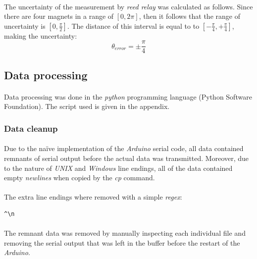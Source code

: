 \documentclass[a4paper]{article}
\begin{document}
\paragraph*{}
The uncertainty of the measurement by \textit{reed relay} was calculated as
follows. Since there are four magnets in a range of $\left[ 0, 2 \pi \right]$,
then it follows that the range of uncertainty is $\left[ 0, \frac{\pi}{2}
\right]$. The distance of this interval is equal to to $\left[ - \frac{\pi}{4}
, + \frac{\pi}{4} \right]$, making the uncertainty:
$$\theta_{error} = \pm \frac{\pi}{4}$$

\subsection{Data processing}

\paragraph*{}
Data processing was done in the \textit{python} programming language (Python
Software Foundation). The script used is given in the appendix.

\subsubsection{Data cleanup}

\paragraph*{}
Due to the na\"{i}ve implementation of the \textit{Arduino} serial code, all
data contained remnants of serial output before the actual data was
transmitted.  Moreover, due to the nature of \textit{UNIX} and \textit{Windows}
line endings, all of the data contained empty \textit{newlines} when copied by
the \textit{cp} command.

\paragraph*{}
The extra line endings where removed with a simple \textit{regex}:

\begin{lstlisting}
^\n
\end{lstlisting}

\paragraph*{}
The remnant data was removed by manually inspecting each individual file and
removing the serial output that was left in the buffer before the restart of
the \textit{Arduino}.
\end{document}
